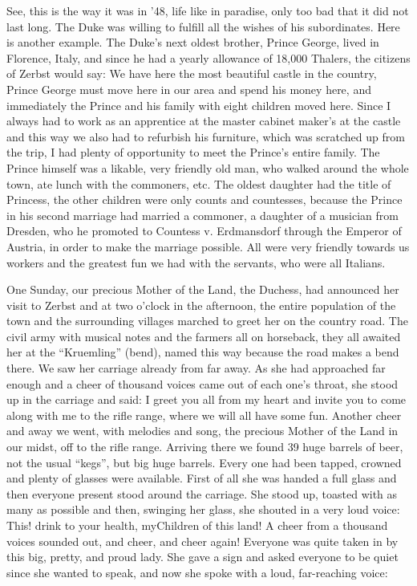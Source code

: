 \documentclass{article}
\begin{document}
See, this is the way it was in '48, life like in paradise, only too bad that it did not last long. The Duke was willing to fulfill all the wishes of his subordinates. Here is another example. The Duke's next oldest brother, Prince George, lived in Florence, Italy, and since he had a yearly allowance of 18,000 Thalers, the citizens of Zerbst would say: We have here the most beautiful castle in the country, Prince George must move here in our area and spend his money here, and immediately the Prince and his family with eight children moved here. Since I always had to work as an apprentice at the master cabinet maker's at the castle and this way we also had to refurbish his furniture, which was scratched up from the trip, I had plenty of opportunity to meet the Prince's entire family. The Prince himself was a likable, very friendly old man, who walked around the whole town, ate lunch with the commoners, etc. The oldest daughter had the title of Princess, the other children were only counts and countesses, because the Prince in his second marriage had married a commoner, a daughter of a musician from Dresden, who he promoted to Countess v. Erdmansdorf through the Emperor of Austria, in order to make the marriage possible. All were very friendly towards us workers and the greatest fun we had with the servants, who were all Italians.

One Sunday, our precious Mother of the Land, the Duchess, had announced her visit to Zerbst and at two o'clock in the afternoon, the entire population of the town and the surrounding villages marched to greet her on the country road. The civil army with musical notes and the farmers all on horseback, they all awaited her at the ``Kruemling'' (bend), named this way because the road makes a bend there. We saw her carriage already from far away. As she had approached far enough and a cheer of thousand voices came out of each one's throat, she stood up in the carriage and said: I greet you all from my heart and invite you to come along with me to the rifle range, where we will all have some fun. Another cheer and away we went, with melodies and song, the precious Mother of the Land in our midst, off to the rifle range. Arriving there we found 39 huge barrels of beer, not the usual ``kegs'', but big huge barrels. Every one had been tapped, crowned and plenty of glasses were available. First of all she was handed a full glass and then everyone present stood around the carriage. She stood up, toasted with as many as possible and then, swinging her glass, she shouted in a very loud voice: This! drink to your health, myChildren of this land! A cheer from a thousand voices sounded out, and cheer, and cheer again! Everyone was quite taken in by this big, pretty, and proud lady. She gave a sign and asked everyone to be quiet since she wanted to speak, and now she spoke with a loud, far-reaching voice:
\end{document}
